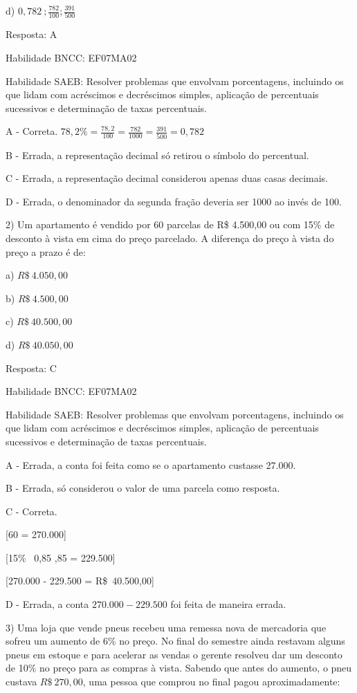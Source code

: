 d) \(0,782\ ;\frac{782}{100};\frac{391}{500}\)

Resposta: A

Habilidade BNCC: EF07MA02

Habilidade SAEB: Resolver problemas que envolvam porcentagens, incluindo
os que lidam com acréscimos e decréscimos simples, aplicação de
percentuais sucessivos e determinação de taxas percentuais.

A - Correta.
\(78,2\% = \frac{78,2}{100} = \frac{782}{1000} = \frac{391}{500} = 0,782\)

B - Errada, a representação decimal só retirou o símbolo do percentual.

C - Errada, a representação decimal considerou apenas duas casas
decimais.

D - Errada, o denominador da segunda fração deveria ser 1000 ao invés de
100.

2) Um apartamento é vendido por \(60\) parcelas de R\$ 4.500,00 ou com
15\% de desconto à vista em cima do preço parcelado. A diferença do
preço à vista do preço a prazo é de:

a) \(R\$\ 4.050,00\)

b) \(R\$\ 4.500,00\)

c) \(R\$\ 40.500,00\)

d) \(R\$\ 40.050,00\)

Resposta: C

Habilidade BNCC: EF07MA02

Habilidade SAEB: Resolver problemas que envolvam porcentagens, incluindo
os que lidam com acréscimos e decréscimos simples, aplicação de
percentuais sucessivos e determinação de taxas percentuais.

A - Errada, a conta foi feita como se o apartamento custasse 27.000.

B - Errada, só considerou o valor de uma parcela como resposta.

C - Correta.

[60  = 270.000]

[15\% \rightarrow {}\ 0,85 ,85  = 229.500]

[270.000 - 229.500 = R\$\ 40.500,00]

D - Errada, a conta \(270.000 - 229.500\) foi feita de maneira errada.

3) Uma loja que vende pneus recebeu uma remessa nova de mercadoria que
sofreu um aumento de 6\% no preço. No final do semestre ainda restavam
alguns pneus em estoque e para acelerar as vendas o gerente resolveu dar
um desconto de 10\% no preço para as compras à vista. Sabendo que antes
do aumento, o pneu custava \(R\$\ 270,00\), uma pessoa que comprou no
final pagou aproximadamente:

